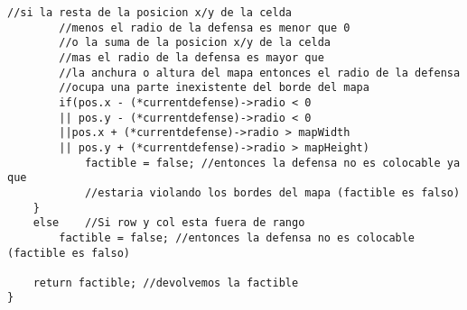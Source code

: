 \begin{lstlisting}[frame=single,basicstyle=\tiny,title={Función de factibilidad}]
		//si la resta de la posicion x/y de la celda 
		//menos el radio de la defensa es menor que 0
		//o la suma de la posicion x/y de la celda 
		//mas el radio de la defensa es mayor que
		//la anchura o altura del mapa entonces el radio de la defensa
		//ocupa una parte inexistente del borde del mapa
		if(pos.x - (*currentdefense)->radio < 0 
		|| pos.y - (*currentdefense)->radio < 0 
		||pos.x + (*currentdefense)->radio > mapWidth 
		|| pos.y + (*currentdefense)->radio > mapHeight)
			factible = false; //entonces la defensa no es colocable ya que 
			//estaria violando los bordes del mapa (factible es falso)
	}
	else	//Si row y col esta fuera de rango
		factible = false; //entonces la defensa no es colocable (factible es falso)

	return factible; //devolvemos la factible
}

\end{lstlisting}
